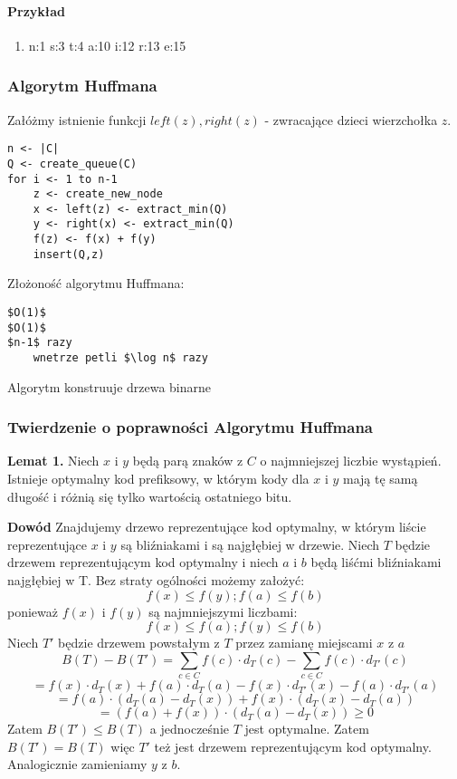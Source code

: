 \paragraph{Przykład}
\begin{enumerate}
\item n:1 s:3 t:4 a:10 i:12 r:13 e:15
\end{enumerate}

\subsubsection{Algorytm Huffmana}
Załóżmy istnienie funkcji $left(z), right(z)$ - zwracające dzieci wierzchołka $z$.
\begin{lstlisting}[caption={Huffman(C,F)}]
n <- |C|
Q <- create_queue(C)
for i <- 1 to n-1
	z <- create_new_node
	x <- left(z) <- extract_min(Q)
	y <- right(x) <- extract_min(Q)
	f(z) <- f(x) + f(y)
	insert(Q,z)
\end{lstlisting}
Złożoność algorytmu Huffmana:
\begin{lstlisting}
$O(1)$
$O(1)$
$n-1$ razy
	wnetrze petli $\log n$ razy
\end{lstlisting}

Algorytm konstruuje drzewa binarne

\subsubsection{Twierdzenie o poprawności Algorytmu Huffmana}
\textbf{Lemat 1.} Niech $x$ i $y$ będą parą znaków z $C$ o najmniejszej liczbie wystąpień. Istnieje optymalny kod prefiksowy, w którym kody dla $x$ i $y$ mają tę samą długość i różnią się tylko wartością ostatniego bitu.

\textbf{Dowód} Znajdujemy drzewo reprezentujące kod optymalny, w którym liście reprezentujące $x$ i $y$ są bliźniakami i są najgłębiej w drzewie. Niech $T$ będzie drzewem reprezentującym kod optymalny i niech $a$ i $b$ będą liśćmi bliźniakami najgłębiej w T. 
Bez straty ogólności możemy założyć:
$$ f(x) \leq f(y); f(a) \leq f(b) $$
ponieważ $f(x)$ i $f(y)$ są najmniejszymi liczbami:
$$ f(x) \leq f(a); f(y) \leq f(b) $$
Niech $T'$ będzie drzewem powstałym z $T$ przez zamianę miejscami $x$ z $a$
$$ B(T) - B(T') = \sum_{c \in C} f(c) \cdot d_T(c) - \sum_{c \in C} f(c) \cdot d_{T'}(c) $$
$$ = f(x) \cdot d_T(x) + f(a) \cdot d_T(a) - f(x) \cdot d_{T'}(x) - f(a) \cdot d_{T'}(a) $$
$$ = f(a) \cdot (d_T(a) - d_T(x)) + f(x) \cdot (d_T(x) - d_T(a)) $$ 
$$ = (f(a) + f(x)) \cdot (d_T(a) - d_T(x)) \geq 0$$
Zatem $B(T') \leq B(T)$ a jednocześnie $T$ jest optymalne. Zatem $B(T') = B(T)$ więc $T'$ też jest drzewem reprezentującym kod optymalny. Analogicznie zamieniamy $y$ z $b$.

